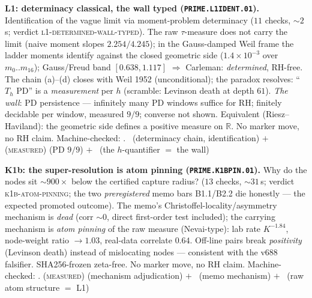 \par\smallskip\noindent\textbf{L1: determinacy classical, the wall
typed (\texttt{PRIME.L1IDENT.01}).}
Identification of the vague limit via moment-problem determinacy
($11$ checks, ${\sim}2$\,s; verdict
\textsc{l1-determined-wall-typed}).  The raw $\tau$-measure does not
carry the limit (naive moment slopes $2.254/4.245$); in the
Gauss-damped Weil frame the ladder moments identify against the
closed geometric side ($1.4\times10^{-3}$ over $m_0..m_{16}$);
Gauss/Freud band $[0.638,1.117]$ $\Rightarrow$ Carleman:
\emph{determined}, RH-free.  The chain (a)--(d) closes with Weil
1952 (unconditional); the paradox resolves: ``$T_h$ PD'' is a
\emph{measurement} per $h$ (scramble: Levinson death at depth
$61$).  \emph{The wall}: PD persistence --- infinitely many PD
windows suffice for RH; finitely decidable per window, measured
$9/9$; converse not shown.  Equivalent (Riesz--Haviland): the
geometric side defines a positive measure on $\mathbb R$.  No
marker move, no RH claim.
Machine-checked: .
\mE\ (determinacy chain, identification) $+$ (\textsc{measured})
(PD $9/9$) $+$ \mO\ (the $h$-quantifier $=$ the wall)
\par\smallskip


\par\smallskip\noindent\textbf{K1b: the super-resolution is atom
pinning (\texttt{PRIME.K1BPIN.01}).}
Why do the nodes sit ${\sim}900\times$ below the certified capture
radius? ($13$ checks, ${\sim}31$\,s; verdict
\textsc{k1b-atom-pinning}; the two \emph{preregistered} memo bars
B1.1/B2.2 die honestly --- the expected promoted outcome).  The
memo's Christoffel-locality/asymmetry mechanism is \emph{dead}
(corr ${\sim}0$, direct first-order test included); the carrying
mechanism is \emph{atom pinning} of the raw measure (Nevai-type):
lab rate $K^{-1.84}$, node-weight ratio $\to1.03$, real-data
correlate $0.64$.  Off-line pairs break \emph{positivity} (Levinson
death) instead of mislocating nodes --- consistent with the v688
falsifier.  SHA256-frozen zeta-free.  No marker move, no RH claim.
Machine-checked: .
(\textsc{measured}) (mechanism adjudication) $+$ \mX\ (memo
mechanism) $+$ \mO\ (raw atom structure $=$ L1)
\par\smallskip


